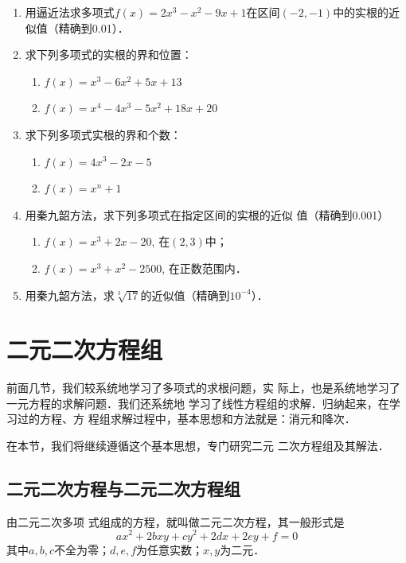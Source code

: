 \begin{enumerate}
    \item 用逼近法求多项式$f(x)=2x^3-x^2-9x+1$在区间$(-2,
    -1)$中的实根的近似值（精确到0.01）．
    \item 求下列多项式的实根的界和位置：
    \begin{enumerate}
        \item  $f(x)=x^3-6x^2+5x+13$
        \item  $f(x)=x^4-4x^3-5x^2+18x+20$
    \end{enumerate}

    \item 求下列多项式实根的界和个数：
    \begin{enumerate}
        \item   $f(x)=4x^3-2x-5$
        \item  $f(x)=x^n+1$
    \end{enumerate}
  
    \item  用秦九韶方法，求下列多项式在指定区间的实根的近似
    值（精确到0.001）
    \begin{enumerate}
      \item $f(x)=x^3+2x-20$, 在$(2,3)$中；
    \item $f(x)=x^3+x^2-2500$, 在正数范围内．
    \end{enumerate}
    \item  用秦九韶方法，求$\sqrt[3]{17}$的近似值（精确到$10^{-4}$）．
\end{enumerate}

\section{二元二次方程组}
前面几节，我们较系统地学习了多项式的求根问题，实
际上，也是系统地学习了一元方程的求解问题．我们还系统地
学习了线性方程组的求解．归纳起来，在学习过的方程、方
程组求解过程中，基本思想和方法就是：消元和降次．

在本节，我们将继续遵循这个基本思想，专门研究二元
二次方程组及其解法．

\subsection{二元二次方程与二元二次方程组}

由二元二次多项
式组成的方程，就叫做二元二次方程，其一般形式是
\begin{equation}
    ax^2+2bxy+cy^2+2dx+2ey+f=0
\end{equation}
其中$a,b,c$不全为零；$d,e,f$为任意实数；$x,y$为二元．

